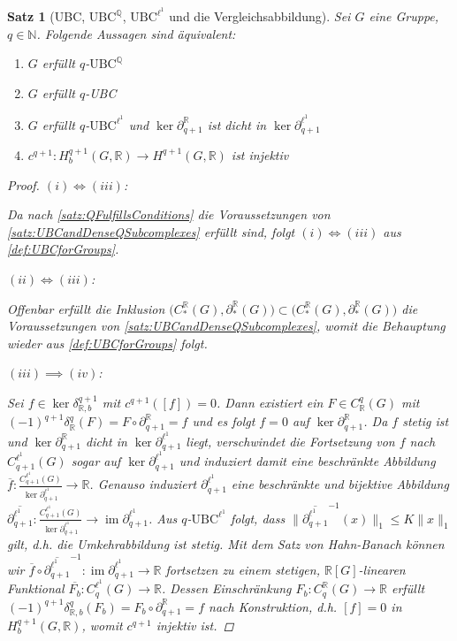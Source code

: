 \documentclass[a4paper,twoside,10pt]{scrreprt}
\DeclareMathOperator{\img}{im}
\newcommand{\UBC}{\text{UBC}}
\newcommand{\N}{\mathbb{N}}
\newcommand{\Q}{\mathbb{Q}}
\newcommand{\R}{\mathbb{R}}
\newtheorem{satz}{Satz}[section]
\theoremstyle{definition}
\begin{document}
\begin{satz}[UBC, $\UBC^{\Q}$, $\UBC^{\ell^1}$ und die Vergleichsabbildung]\label{satz:UBCandComparisonMap}
Sei $G$ eine Gruppe, $q\in \N$. Folgende Aussagen sind äquivalent:
\renewcommand{\labelenumi}{(\roman{enumi}) }
\begin{enumerate}
\item $G$ erfüllt $q$-$\UBC^{\Q}$
\item $G$ erfüllt $q$-UBC
\item $G$ erfüllt $q$-$\text{UBC}^{\ell^1}$ und $\ker \partial_{q+1}^{\R}$ ist dicht in $\ker \partial_{q+1}^{\ell^1}$
\item $c^{q+1}:H_b^{q+1}(G,\R)\to H^{q+1}(G,\R)$ ist injektiv
\end{enumerate}
\begin{proof}
$(i)\Longleftrightarrow(iii)$:\par
Da nach \cref{satz:QFulfillsConditions} die Voraussetzungen von \cref{satz:UBCandDenseQSubcomplexes} erfüllt sind, folgt $(i)\Longleftrightarrow(iii)$ aus \cref{def:UBCforGroups}.\par\noindent
$(ii)\Longleftrightarrow(iii)$:\par
Offenbar erfüllt die Inklusion $\bigl(C_*^{\R}(G),\partial_*^{\R}(G)\bigr)\subset (C_*^{\R}(G),\partial_*^{\R}(G)\bigr)$ die Voraussetzungen von \cref{satz:UBCandDenseQSubcomplexes}, womit die Behauptung wieder aus \cref{def:UBCforGroups} folgt.\par\noindent
$(iii)\implies (iv)$:\par
Sei $f\in \ker \delta_{\R,b}^{q+1}$ mit $c^{q+1}([f])=0$. Dann existiert ein $F\in C_{\R}^q(G)$ mit $(-1)^{q+1}\delta_{\R}^q(F)=F\circ \partial_{q+1}^{\R}=f$ und es folgt $f=0$ auf $\ker \partial_{q+1}^{\R}$. Da $f$ stetig ist und $\ker \partial_{q+1}^{\R}$ dicht in $\ker \partial_{q+1}^{\ell^1}$ liegt, verschwindet die Fortsetzung von $f$ nach $C^{\ell^1}_{q+1}(G)$ sogar auf $\ker \partial_{q+1}^{\ell^1}$ und induziert damit eine beschränkte Abbildung $\overline{f}:\frac{C_{q+1}^{\ell^1}(G)}{\ker \partial_{q+1}^{\ell^1}}\to \R$. Genauso induziert $\partial_{q+1}^{\ell^1}$ eine beschränkte und bijektive Abbildung $\overline{\partial_{q+1}^{\ell^1}}:\frac{C_{q+1}^{\ell^1}(G)}{\ker \partial_{q+1}^{\ell^1}}\to \img \partial_{q+1}^{\ell^1}$. Aus $q$-$\text{UBC}^{\ell^1}$ folgt, dass $\|\overline{\partial_{q+1}^{\ell^1}}^{-1}(x)\|_1\leq K\|x\|_1$ gilt, d.h. die Umkehrabbildung ist stetig. Mit dem Satz von Hahn-Banach können wir $\overline{f}\circ \overline{\partial_{q+1}^{\ell^1}}^{-1}:\img \partial_{q+1}^{\ell^1}\to \R$ fortsetzen zu einem stetigen, $\R[G]$-linearen Funktional $\overline{F_b}:C_q^{\ell^1}(G)\to \R$. Dessen Einschränkung $F_b:C^{\R}_q(G)\to \R$ erfüllt $(-1)^{q+1}\delta_{\R,b}^q(F_b)=F_b\circ \partial_{q+1}^{\R}=f$ nach Konstruktion, d.h. $[f]=0$ in $H_b^{q+1}(G,\R)$, womit $c^{q+1}$ injektiv ist.\par\noindent

\end{proof}
\end{satz}
\end{document}
